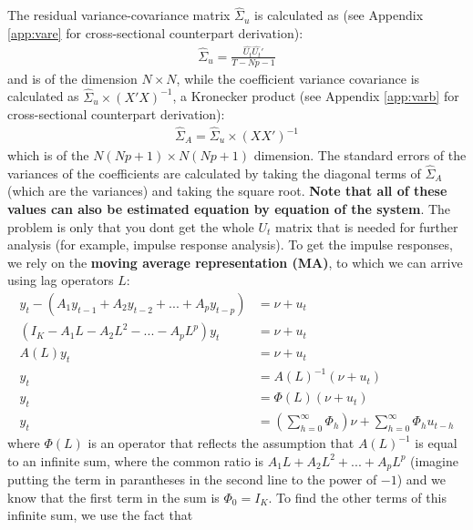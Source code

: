 \documentclass[a4paper, 12pt]{article}
\begin{document}
The residual variance-covariance matrix $\hat{\Sigma}_u$ is calculated as (see Appendix \ref{app:vare} for cross-sectional counterpart derivation):
\begin{equation}
\begin{aligned}
\hat{\Sigma}_u = \frac{\hat{U_t}\hat{U_t}'}{T-Np-1} \nonumber 
\end{aligned}
\end{equation}
and is of the dimension $N \times N$, while the coefficient variance covariance is calculated as $\hat{\Sigma}_u \times (X'X)^{-1}$, a Kronecker product (see Appendix \ref{app:varb} for cross-sectional counterpart derivation):
\begin{equation}
\begin{aligned}
\hat{\Sigma}_A = \hat{\Sigma}_u \times (XX')^{-1} \nonumber 
\end{aligned}
\end{equation}
which is of the $N(Np+1) \times N(Np+1)$ dimension.
The standard errors of the variances of the coefficients are calculated by taking the diagonal terms of $\hat{\Sigma}_A$ (which are the variances) and taking the square root. 
\textbf{Note that all of these values can also be estimated equation by equation of the system}. The problem is only that you dont get the whole $U_t$ matrix that is needed for further analysis (for example, impulse response analysis). 
To get the impulse responses, we rely on the \textbf{moving average representation (MA)}, to which we can arrive using lag operators $L$:
\begin{equation}
\begin{aligned}
y_t - (A_1 y_{t-1}+A_2 y_{t-2}+...+A_p y_{t-p})&=\nu + u_t \nonumber \\
(I_K-A_1 L- A_2L^2-...-A_pL^p)y_t&=\nu + u_t \\
A(L)y_t&=\nu+u_t \\
y_t&=A(L)^{-1}(\nu+u_t)\\
y_t&=\Phi(L)(\nu+u_t)\\
y_t&=\left(\sum_{h=0}^\infty\Phi_h\right)\nu+\sum_{h=0}^\infty\Phi_hu_{t-h}
\end{aligned}
\end{equation}
where $\Phi (L)$ is an operator that reflects the assumption that $A(L)^{-1}$ is equal to an infinite sum, where the common ratio is
$A_1 L+A_2L^2+...+A_pL^p$ (imagine putting the term in parantheses in the second line to the power of $-1$) and we know that the first term in the sum is $\Phi_0=I_K$. To find the other terms of this infinite sum, we use the fact that
\end{document}
